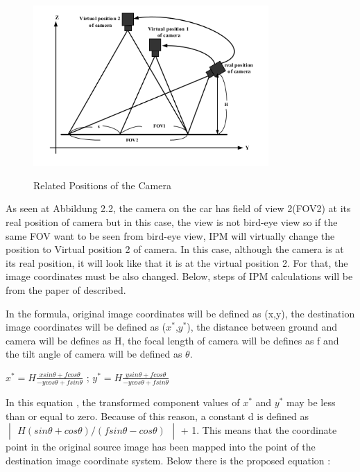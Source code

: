   
  \begin{figure}[H]
 \centering
  \includegraphics[width=0.8\textwidth]{./Bilder/Related_positions_of_the_camera.png}\label{Procedures_of_IPM}
  \caption{Related Positions of the Camera \cite{IPM}}
\end{figure}

 As seen at Abbildung 2.2, the camera on the car has field of view 2(FOV2) at its real position of camera but in this 
 case, the view is not bird-eye view so if the same FOV want to be seen from bird-eye view, IPM will virtually change
 the position to Virtual position 2 of camera. In this case, although the camera is at its real position, it will look
 like that it is at the virtual position 2. For that, the image coordinates must be also changed. Below, steps of IPM 
 calculations will be from the paper of \cite{IPM} described.
 
 In the formula, original image coordinates will be defined as (x,y), the destination image coordinates will be 
 defined as ($x^*$,$y^*$), the distance between ground and camera will be defines as H, the focal length of camera 
 will be defines as f and the tilt angle of camera will be defined as $\theta$.
 
\begin{center}
 $x^* = H \frac{x sin \theta + f cos \theta}{-y cos \theta + f sin \theta}$ ;
 $y^* = H \frac{y sin \theta + f cos \theta}{-y cos \theta + f sin \theta}$ 
\end{center}

In this equation , the transformed component values of $x^*$ and $y^*$ may be less than or equal to zero. Because of 
this reason, a constant d is defined as $
\begin{vmatrix}
H(sin \theta + cos \theta)/(f sin \theta - cos \theta) 
\end{vmatrix}
$  + 1. This means that the coordinate point in the original source image has been mapped into the point of  the 
destination image coordinate system. Below there is the proposed equation :
 
